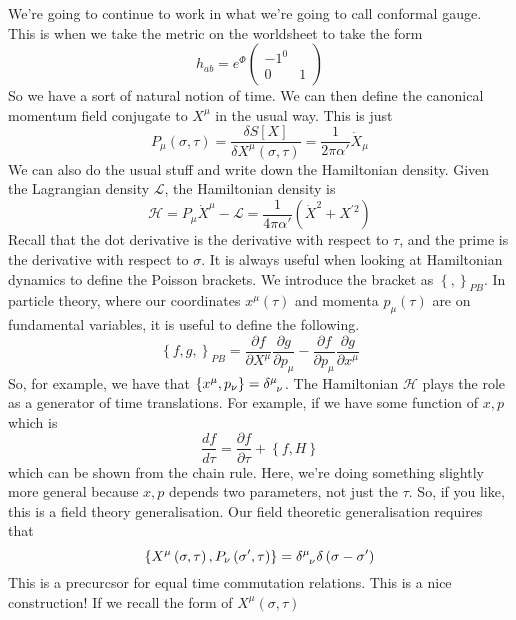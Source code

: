 \documentclass[11pt, oneside]{article}   	%
\theoremstyle{slanted}
\begin{document}
We're going to continue to
work in what we're going to 
call conformal gauge. 
This is when we take the metric 
on the worldsheet to take 
the form 
\[
h _{ ab }  = e ^{ \Phi } \begin{pmatrix}  
- 1 ^ 0 \\ 0 & 1 \end{pmatrix} 
\] So we have a sort of natural notion of time. 
We can then define the 
canonical momentum field 
conjugate to $  X^ \mu $ 
in the usual way. 
This is just 
\[
P _ \mu \left( \sigma, \tau  \right)   = \frac{\delta S \left[  X  \right]  }{ 
\delta X ^ \mu \left( \sigma, \tau  \right)  }  = \frac{1}{2 \pi \alpha   ' }\dot{ X } _ \mu   
\] We can also do the usual stuff 
and write down the Hamiltonian density. 
Given the Lagrangian density 
$ \mathcal{ L } $, the Hamiltonian 
density is 
\[
\mathcal{ H }  = P _ \mu \dot{ X } ^ \mu  - \mathcal{ L }  = \frac{1}{4 \pi \alpha  ' }
\left( \dot{ X } ^ 2 + X ^{ ' 2 }   \right)  
\]  Recall that the 
dot derivative is the derivative 
with respect to $ \tau $, and the prime is the 
derivative with respect to $ \sigma $. 
It is always useful when looking at 
Hamiltonian dynamics 
to define the Poisson brackets. 
We introduce the bracket as $ \left\{  ,  \right\}  _{ P B } $. 
In particle theory, 
where our coordinates 
$ x ^ \mu \left( \tau  \right)  $ and 
momenta $ p _ \mu \left( \tau  \right)  $ are 
on fundamental variables, it is useful to define the following. 
\[
\left\{  f, g,  \right\}  _{ P B }  = 
\frac{\partial  f }{\partial  X ^ \mu }  \frac{\partial  g }{\partial  p_ \mu }  
- \frac{\partial  f }{\partial  p _ \mu }  \frac{\partial  g }{\partial  x^ \mu } 
\]  So, for example, we have that 
$ \left\{ x ^ \mu , p _ \nu  \right\}   = \delta \indices{ ^ \mu _ \nu }  $. 
The Hamiltonian $ \mathcal{ H } $ plays the 
role as a generator 
of time translations. For example, if we 
have some function of $ x, p $ which is 
\[
\frac{df }{ d \tau }  = \frac{\partial  f }{\partial \tau } + \left\{  f, H  \right\}   
\] which can be shown from the chain rule. 
Here, we're doing something slightly more 
general because $ x , p $ depends 
two parameters, not just the $ \tau $. 
So, if you like, this 
is a field theory generalisation. 
Our field theoretic generalisation 
requires that 
\[
\left\{ X ^ \mu \left( \sigma, \tau  \right) , P _ \nu 
\left( \sigma ' , \tau  \right)  \right\}    = \delta \indices{ ^ \mu _ \nu } 
\delta \left( \sigma - \sigma  '  \right) 
\]   This is a precurcsor 
for equal time commutation relations. 
This is a nice construction! 
If we recall the form of $ X ^ \mu \left( \sigma, \tau  \right)  $ 
\end{document}
